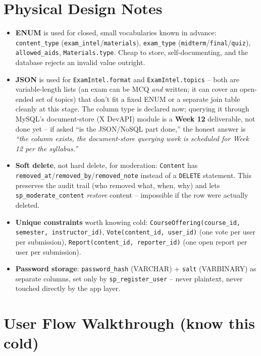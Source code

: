 \documentclass[11pt]{article}
\newenvironment{tightlist}{\begin{itemize}[leftmargin=1.4em,itemsep=2pt,topsep=2pt]}{\end{itemize}}
\begin{document}
\section{Physical Design Notes}

\begin{tightlist}
  \item \textbf{ENUM} is used for closed, small vocabularies known in advance: \texttt{content\_type} (\texttt{exam\_intel}/\texttt{materials}), \texttt{exam\_type} (\texttt{midterm}/\texttt{final}/\texttt{quiz}), \texttt{allowed\_aids}, \texttt{Materials.type}. Cheap to store, self-documenting, and the database rejects an invalid value outright.
  \item \textbf{JSON} is used for \texttt{ExamIntel.format} and \texttt{ExamIntel.topics} -- both are variable-length lists (an exam can be MCQ \emph{and} written; it can cover an open-ended set of topics) that don't fit a fixed ENUM or a separate join table cleanly at this stage. The column type is declared now; querying it through MySQL's document-store (X DevAPI) module is a \textbf{Week 12} deliverable, not done yet -- if asked ``is the JSON/NoSQL part done,'' the honest answer is \emph{``the column exists, the document-store querying work is scheduled for Week 12 per the syllabus.''}
  \item \textbf{Soft delete}, not hard delete, for moderation: \texttt{Content} has \texttt{removed\_at}/\texttt{removed\_by}/\texttt{removed\_note} instead of a \texttt{DELETE} statement. This preserves the audit trail (who removed what, when, why) and lets \texttt{sp\_moderate\_content} \emph{restore} content -- impossible if the row were actually deleted.
  \item \textbf{Unique constraints} worth knowing cold: \texttt{CourseOffering(course\_id, semester, instructor\_id)}, \texttt{Vote(content\_id, user\_id)} (one vote per user per submission), \texttt{Report(content\_id, reporter\_id)} (one open report per user per submission).
  \item \textbf{Password storage}: \texttt{password\_hash} (VARCHAR) + \texttt{salt} (VARBINARY) as separate columns, set only by \texttt{sp\_register\_user} -- never plaintext, never touched directly by the app layer.
\end{tightlist}

\section{User Flow Walkthrough (know this cold)}
\end{document}
